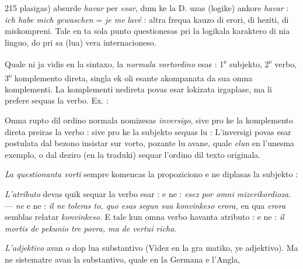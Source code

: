 \begin{VUpage}[219]{215}
\VUcontinue
plasigas) absurde \textit{havar} per \textit{esar}, dum ke la D. uzas (logike)\nl
ankore \textit{havar} : \textit{ich habe mich gewaschen} = \textit{je me}  \textit{lavé} :\nl
altra frequa kauzo di erori, di heziti, di miskompreni. Tale\nl
en ta sola punto questionesas pri la logikala karaktero di\nl
nia linguo, do pri sa (lua) vera internacioneso.

\VUsaut{4.61mm}
\VUfilet{7.7mm}
\VUsaut{3.20mm}
\VUsaut{2.39mm}
\VUsaut{4.02mm}

Quale ni ja vidis en la sintaxo, la \textit{normala vortordino}\nl
esas : 1\textsuperscript{e} subjekto, 2\textsuperscript{e} verbo, 3\textsuperscript{e} komplemento direta, singla\nl
ek oli esante akompanata da sua omna komplementi. La\nl
komplementi nedireta povas esar lokizata irgaplase, ma li\nl
prefere sequas la verbo. Ex. : \nl
{}\cc
{}

Omna rupto dil ordino normala nomizesas \textit{inversigo}, sive\nl
pro ke la komplemento direta preiras la verbo : \nl
{} sive pro ke la subjekto sequas lu : \nl
{} L'inversigi povas esar postulata dal\nl
bezono insistar sur vorto, pozante lu avane, quale \textit{elun} en\nl
l'unesma exemplo, o dal deziro (en la traduki) sequar\nl
l'ordino dil texto originala.

\textit{La questionanta vorti} sempre komencas la propoziciono e\nl
ne diplasas la subjekto : \nl
{}\nl
{}

\textit{L'atributo} devas quik sequar la verbo esar : \cc
{} e ne : \textit{esez por omni mizerikordioza.} ---  \textit{ne}\nl
{} e ne : \textit{il ne}\nl
\textit{toleras to, quo esas segun sua konvinkeso erora,} en qua \textit{erora}\nl
semblas relatar \textit{konvinkeso}. E tale kun omna verbo havanta\nl
atributo : \nl
e ne : \textit{il mortis de pekunio tre povra, ma de vertui richa.}

\textit{L'adjektivo} avan o dop lua substantivo (Videz en la gra\cc
matiko, ye adjektivo). Ma ne sistematre avan la substantivo,\nl
quale en la Germana e l'Angla,\nl
\end{VUpage}

